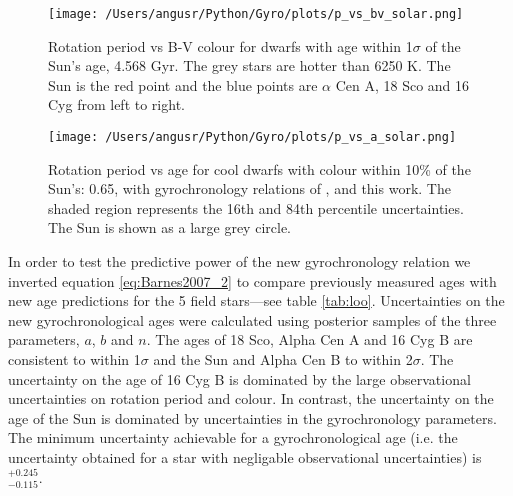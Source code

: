 \documentclass[10pt,preprint]{aastex}
\begin{document}
\begin{figure}[ht]
\begin{center}
\texttt{[image: /Users/angusr/Python/Gyro/plots/p\_vs\_bv\_solar.png]}
\caption{Rotation period vs B-V colour for dwarfs with age within 1$\sigma$ of the Sun's age, 4.568 Gyr. The grey stars are hotter than 6250 K. The Sun is the red point and the blue points are $\alpha$ Cen A, 18 Sco and 16 Cyg from left to right.}
\label{fig:p_vs_bv_solar}
\end{center}
\end{figure}

\begin{figure}[ht]
\begin{center}
\texttt{[image: /Users/angusr/Python/Gyro/plots/p\_vs\_a\_solar.png]}
\caption{Rotation period vs age for cool dwarfs with colour within 10\% of the Sun's: 0.65, with gyrochronology relations of \citet{Barnes2007}, \citet{Mamajek2008} and this work. The shaded region represents the 16th and 84th percentile uncertainties. The Sun is shown as a large grey circle.}
\label{fig:p_vs_a_solar}
\end{center}
\end{figure}


In order to test the predictive power of the new gyrochronology relation we inverted equation \ref{eq:Barnes2007_2}
to compare previously measured ages with new age predictions for the 5 field stars---see table \ref{tab:loo}.
Uncertainties on the new gyrochronological ages were calculated using posterior samples of the three parameters, $a$, $b$ and $n$.
The ages of 18 Sco, Alpha Cen A and 16 Cyg B are consistent to within 1$\sigma$ and the Sun and Alpha Cen B to within 2$\sigma$.
The uncertainty on the age of 16 Cyg B is dominated by the large observational uncertainties on rotation period and colour.
In contrast, the uncertainty on the age of the Sun is dominated by uncertainties in the gyrochronology parameters.
The minimum uncertainty achievable for a gyrochronological age (i.e. the uncertainty obtained for a star with negligable observational uncertainties) is $^{+0.245}_{-0.115}$.
\end{document}
